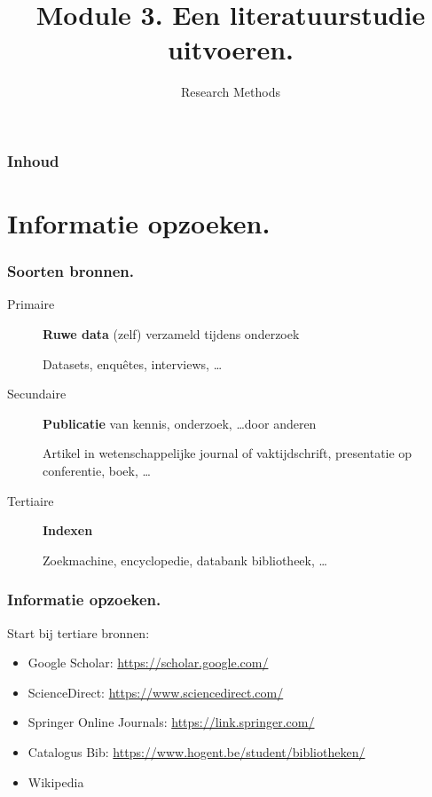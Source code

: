\documentclass[aspectratio=169]{beamer}
\title{Module 3. Een literatuurstudie uitvoeren.}
\subtitle{Research Methods}
\author{\lecturers}   %
\date{\academicyear}
\begin{document}
\begin{frame}
  \maketitle
\end{frame}

\begin{frame}
  \frametitle{Inhoud}

  \tableofcontents
\end{frame}

\section{Informatie opzoeken.}

\begin{frame}
  \frametitle{Soorten bronnen.}

  \begin{description}
    \item[Primaire] \textbf{Ruwe data} (zelf) verzameld tijdens onderzoek

      Datasets, enquêtes, interviews, \ldots

    \item[Secundaire] \textbf{Publicatie} van kennis, onderzoek, \ldots door anderen

      Artikel in wetenschappelijke journal of vaktijdschrift, presentatie op conferentie, boek, \ldots

    \item[Tertiaire] \textbf{Indexen}

      Zoekmachine, encyclopedie, databank bibliotheek, \ldots

  \end{description}

\end{frame}

\begin{frame}
  \frametitle{Informatie opzoeken.}

  Start bij \alert{tertiare} bronnen:

  \begin{itemize}
    \item Google Scholar: \url{https://scholar.google.com/}
    \item ScienceDirect: \url{https://www.sciencedirect.com/}
    \item Springer Online Journals: \url{https://link.springer.com/}
    \item Catalogus Bib: \url{https://www.hogent.be/student/bibliotheken/}
    \item Wikipedia
  \end{itemize}
\end{frame}
\end{document}
